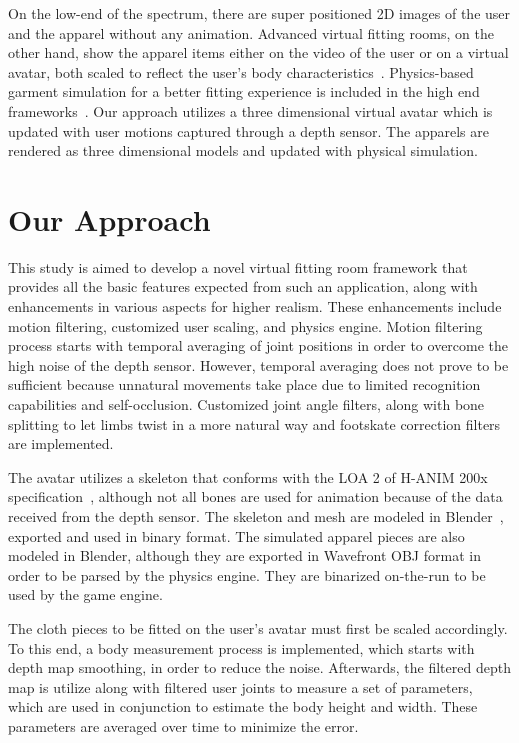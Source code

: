 On the low-end of the spectrum, there are super positioned 2D images of the user and the apparel without any animation. Advanced virtual fitting rooms, on the other hand, show the apparel items either on the video of the user or on a virtual avatar, both scaled to reflect the user's body characteristics~\cite{FaceCake2013}. Physics-based garment simulation for a better fitting experience is included in the high end frameworks~\cite{Styku2013}. Our approach utilizes a three dimensional virtual avatar which is updated with user motions captured through a depth sensor. The apparels are rendered as three dimensional models and updated with physical simulation.  

\section{Our Approach}

This study is aimed to develop a novel virtual fitting room framework that provides all the basic features expected from such an application, along with enhancements in various aspects for higher realism. These enhancements include motion filtering, customized user scaling, and physics engine. Motion filtering process starts with temporal averaging of joint positions in order to overcome the high noise of the depth sensor. However, temporal averaging does not prove to be sufficient because unnatural movements take place due to limited recognition capabilities and self-occlusion. Customized joint angle filters, along with bone splitting to let limbs twist in a more natural way and footskate correction filters are implemented.

The avatar utilizes a skeleton that conforms with the LOA 2 of H-ANIM 200x specification~\cite{HANIM}, although not all bones are used for animation because of the data received from the depth sensor. The skeleton and mesh are modeled in Blender~\cite{Blender}, exported and used in binary format. The simulated apparel pieces are also modeled in Blender, although they are exported in Wavefront OBJ format in order to be parsed by the physics engine. They are binarized on-the-run to be used by the game engine. 

The cloth pieces to be fitted on the user's avatar must first be scaled accordingly. To this end, a body measurement process is implemented, which starts with depth map smoothing, in order to reduce the noise. Afterwards, the filtered depth map is utilize along with filtered user joints to measure a set of parameters, which are used in conjunction to estimate the body height and width. These parameters are averaged over time to minimize the error.

